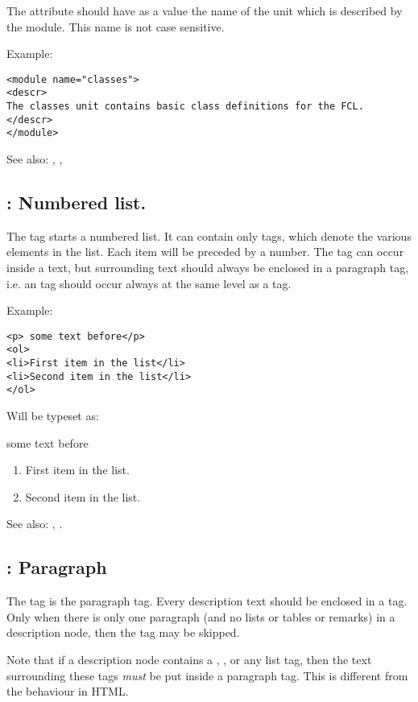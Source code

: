 The  attribute should have as a value the name of the unit which
is described by the module. This name is not case sensitive.

Example:
\begin{verbatim}
<module name="classes">
<descr>
The classes unit contains basic class definitions for the FCL.
</descr>
</module>
\end{verbatim}

See also: , , 

\subsection{ : Numbered list.}
\label{tag:ol}
The  tag starts a numbered list. It can contain only 
tags, which denote the various elements in the list. Each item will be
preceded by a number. The  tag can
occur inside a text, but surrounding text should always be enclosed in a
 paragraph tag, i.e. an  tag should occur always at the
same level as a  tag.

Example:
\begin{verbatim}
<p> some text before</p>
<ol>
<li>First item in the list</li>
<li>Second item in the list</li>
</ol>
\end{verbatim}
Will be typeset as:

some text before
\begin{enumerate}
\item First item in the list.
\item Second item in the list.
\end{enumerate}

See also: , .


\subsection{ : Paragraph}
\label{tag:p}
The  tag is the paragraph tag. Every description text should be 
enclosed in a  tag. Only when there is only one paragraph (and no
lists or tables or remarks) in a description node, then the  tag  may
be skipped.

Note that if a description node contains a , , 
or any list tag, then the text surrounding these tags {\em must} be  put 
inside a  paragraph tag. This is different from the behaviour in HTML.

